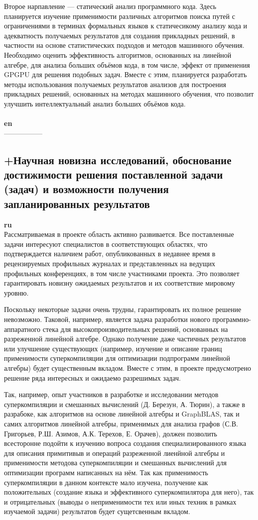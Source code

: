 \documentclass[12pt]{article}  %
\theoremstyle{remark}
\begin{document}
Второе нарпавление --- статический анализ программного кода. Здесь планируется изучение применимости различных алгоритмов поиска путей с ограничениями в терминах формальных языков к статичесикому анализу кода и адекватность получаемых результатов для создания прикладных решений, в частности на основе статистических подходов и методов машинного обучения. Необходимо оценить эффективность алгоритмов, основанных на линейной алгебре, для анализа больших объёмов кода, в том числе, эффект от применения GPGPU для решения подобных задач. Вместе с этим, планируется разработать методы использования получаемых результатов анализов для построения прикладных решений, основанных на методах машинного обучения, что позволит улучшить интеллектуальный анализ больших объёмов кода.
\\
\\
\textbf{en}\\
-----------------

\subsection{+Научная новизна исследований, обоснование достижимости решения поставленной задачи (задач) и возможности получения запланированных результатов}

\textbf{ru}\\
%
Рассматриваемая в проекте область активно развивается. Все поставленные задачи интересуют специалистов в соответствующих областях, что подтверждается наличием работ, опубликованных в недавнее время в рецензируемых профильных журналах и представленных на ведущих профильных конференциях, в том числе участниками проекта. Это позволяет гарантировать новизну ожидаемых результатов и их соответствие мировому уровню.

Поскольку некоторые задачи очень трудны, гарантировать их полное решение невозможно. Таковой, например, является задача разработки нового программно-аппаратного стека для высокопроизводительных решений, основанных на разреженной линейной алгебре. Однако получение даже частичных результатов или улучшение существующих (например, изучение и описание границ применимости суперкомпиляции для оптимизации подпрограмм линейной алгебры) будет существенным вкладом. Вместе с этим, в проекте предусмотрено решение ряда интересных и ожидаемо разрешимых задач.

Так, например, опыт участников в разработке и исследовании методов суперкомпиляции и смешанных вычислений (Д. Березун, А. Тюрин), а также в разрабоке, как алгоритмов на основе линейной алгебры и GraphBLAS, так и самих алгоритмов линейной алгебры, применимых для анализа графов (С.В. Григорьев, Р.Ш. Азимов, А.К. Терехов, Е. Орачев), должен позволить всесторонне подойти к изучению вопроса создания специализированного языка для описания примитивыв и операций разреженной лиенйной алгебры и применимости методова суперкомпиляции и смешанных вычислений для оптимизации программ написанных на нём. Так как применимость суперкомпиляции в данном контексте мало изучена, получение как положительных (создание языка и эффективного суперкомпилятора для него), так и отрицательных (выводы о неприменимости тех или иных техник  в рамках изучаемой задачи) результатов будет сущетсвенным вкладом.
\end{document}
